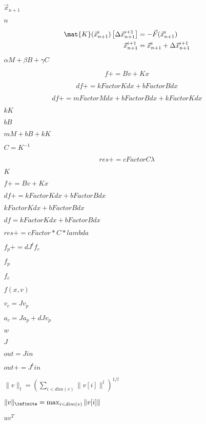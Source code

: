\documentclass{article}
\begin{document}
$\vec{x}_{n+1}$
\pagebreak

$n$
\pagebreak

\begin{align*} \mat{K}(\vec{x}_{n+1}^i) \left [ \Delta \vec{x}_{n+1}^{i+1} \right ] &= - \vec{F}(\vec{x}_{n+1}^i) \\ \vec{x}_{n+1}^{i+1} &= \vec{x}_{n+1}^{i} + \Delta \vec{x}_{n+1}^{i+1} \end{align*}
\pagebreak

$ \alpha M + \beta B + \gamma C $
\pagebreak

\[ f += B v + K x \]
\pagebreak

\[ df += kFactor K dx + bFactor B dx \]
\pagebreak

\[ df += mFactor M dx + bFactor B dx + kFactor K dx \]
\pagebreak

$ k K $
\pagebreak

$ b B $
\pagebreak

$ m M + b B + k K $
\pagebreak

$ C = K^{-1} $
\pagebreak

\[ res += cFactor C \lambda \]
\pagebreak

$ K $
\pagebreak

$ f += B v + K x $
\pagebreak

$ df += kFactor K dx + bFactor B dx $
\pagebreak

$ kFactor K dx + bFactor B dx $
\pagebreak

$ df = kFactor K dx + bFactor B dx $
\pagebreak

$ res += cFactor * C * lambda $
\pagebreak

$ f_p += dJ^t f_c $
\pagebreak

$ f_p $
\pagebreak

$ f_c $
\pagebreak

$ f(x,v)$
\pagebreak

$ v_c = J v_p $
\pagebreak

$ a_c = J a_p + dJ v_p $
\pagebreak

$ w $
\pagebreak

$ J $
\pagebreak

$ out = J in $
\pagebreak

$ out += J^t in $
\pagebreak

$ \|v\|_l = ( \sum_{i<dim(v)} \|v[i]\|^{l} )^{1/l} $
\pagebreak

$ \|v\|_\infinite = \max_{i<dim(v)} \|v[i]\| $
\pagebreak

$ u v^T $
\pagebreak
\end{document}
